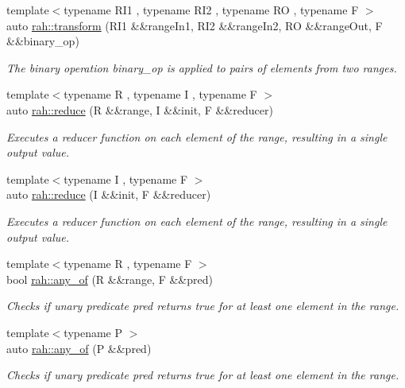\begin{DoxyCompactItemize}
{\footnotesize template$<$typename R\+I1 , typename R\+I2 , typename RO , typename F $>$ }\\auto \mbox{\hyperlink{namespacerah_a7bac191e66e0d3f3823e0c08382f0418}{rah\+::transform}} (R\+I1 \&\&range\+In1, R\+I2 \&\&range\+In2, RO \&\&range\+Out, F \&\&binary\+\_\+op)
\begin{DoxyCompactList}\small\item\em The binary operation binary\+\_\+op is applied to pairs of elements from two ranges. \end{DoxyCompactList}\item 
{\footnotesize template$<$typename R , typename I , typename F $>$ }\\auto \mbox{\hyperlink{namespacerah_a407b50a4f029e3f2a3cd0ba9142aea84}{rah\+::reduce}} (R \&\&range, I \&\&init, F \&\&reducer)
\begin{DoxyCompactList}\small\item\em Executes a reducer function on each element of the range, resulting in a single output value. \end{DoxyCompactList}\item 
{\footnotesize template$<$typename I , typename F $>$ }\\auto \mbox{\hyperlink{namespacerah_a6a6b7b7e3b78bb4bd16372fbb688c152}{rah\+::reduce}} (I \&\&init, F \&\&reducer)
\begin{DoxyCompactList}\small\item\em Executes a reducer function on each element of the range, resulting in a single output value. \end{DoxyCompactList}\item 
{\footnotesize template$<$typename R , typename F $>$ }\\bool \mbox{\hyperlink{namespacerah_a836c57da2bd108c491f3ba96786f6aa4}{rah\+::any\+\_\+of}} (R \&\&range, F \&\&pred)
\begin{DoxyCompactList}\small\item\em Checks if unary predicate pred returns true for at least one element in the range. \end{DoxyCompactList}\item 
{\footnotesize template$<$typename P $>$ }\\auto \mbox{\hyperlink{namespacerah_aa3f330b2354859d8a9e6df794a1e7a1a}{rah\+::any\+\_\+of}} (P \&\&pred)
\begin{DoxyCompactList}\small\item\em Checks if unary predicate pred returns true for at least one element in the range. \end{DoxyCompactList}\item 

\end{DoxyCompactItemize}
